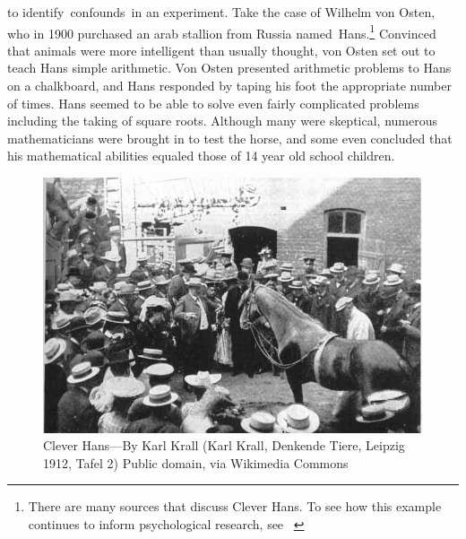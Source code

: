 \begin{refsection}
 to identify confounds in an experiment. Take the case of Wilhelm von Osten, who in 1900 purchased an arab stallion from Russia named Hans.\footnote{There are many sources that discuss Clever Hans. To see how this example continues to inform psychological research, see ~\citep{DeSio:2014kp}} Convinced that animals were more intelligent than usually thought, von Osten set out to teach Hans simple arithmetic. Von Osten presented arithmetic problems to Hans on a chalkboard, and Hans responded by taping his foot the appropriate number of times. Hans seemed to be able to solve even fairly complicated problems including the taking of square roots. Although many were skeptical, numerous mathematicians were brought in to test the horse, and some even concluded that his mathematical abilities equaled those of 14 year old school children.

\begin{figure}\includegraphics{../images/CleverHans.jpg}\caption{Clever Hans---By Karl Krall (Karl Krall, Denkende Tiere, Leipzig 1912, Tafel 2) Public domain, via Wikimedia Commons}\label{fig:cleverhans}\end{figure}


\end{refsection}
